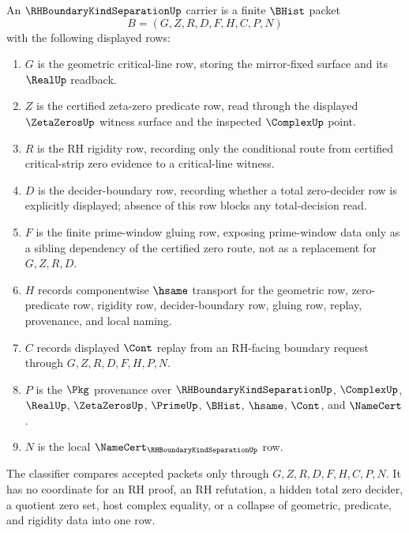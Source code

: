 \begin{definition}\label{def:rh-boundary-kind-separation-carrier}
An $\RHBoundaryKindSeparationUp$ carrier is a finite $\BHist$ packet
$$
B=(G,Z,R,D,F,H,C,P,N)
$$
with the following displayed rows:
\begin{enumerate}
\item $G$ is the geometric critical-line row, storing the mirror-fixed surface and its $\RealUp$ readback.
\item $Z$ is the certified zeta-zero predicate row, read through the displayed $\ZetaZerosUp$ witness surface and the inspected $\ComplexUp$ point.
\item $R$ is the RH rigidity row, recording only the conditional route from certified critical-strip zero evidence to a critical-line witness.
\item $D$ is the decider-boundary row, recording whether a total zero-decider row is explicitly displayed; absence of this row blocks any total-decision read.
\item $F$ is the finite prime-window gluing row, exposing prime-window data only as a sibling dependency of the certified zero route, not as a replacement for $G,Z,R,D$.
\item $H$ records componentwise $\hsame$ transport for the geometric row, zero-predicate row, rigidity row, decider-boundary row, gluing row, replay, provenance, and local naming.
\item $C$ records displayed $\Cont$ replay from an RH-facing boundary request through $G,Z,R,D,F,H,P,N$.
\item $P$ is the $\Pkg$ provenance over $\RHBoundaryKindSeparationUp$, $\ComplexUp$, $\RealUp$, $\ZetaZerosUp$, $\PrimeUp$, $\BHist$, $\hsame$, $\Cont$, and $\NameCert$.
\item $N$ is the local $\NameCert_{\RHBoundaryKindSeparationUp}$ row.
\end{enumerate}
The classifier compares accepted packets only through $G,Z,R,D,F,H,C,P,N$. It has no coordinate for an RH proof, an RH refutation, a hidden total zero decider, a quotient zero set, host complex equality, or a collapse of geometric, predicate, and rigidity data into one row.
\end{definition}

